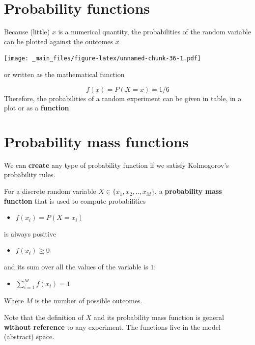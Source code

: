 \documentclass[
]{book}
\providecommand{\tightlist}{%
  \setlength{\itemsep}{0pt}\setlength{\parskip}{0pt}}
\begin{document}
\hypertarget{probability-functions}{%
\section{Probability functions}\label{probability-functions}}

Because (little) \(x\) is a numerical quantity, the probabilities of the random variable can be plotted against the outcomes \(x\)

\texttt{[image: \_main\_files/figure-latex/unnamed-chunk-36-1.pdf]}

or written as the mathematical function

\[f(x)=P(X=x)=1/6\]
Therefore, the probabilities of a random experiment can be given in table, in a plot or as a \textbf{function}.

\hypertarget{probability-mass-functions}{%
\section{Probability mass functions}\label{probability-mass-functions}}

We can \textbf{create} any type of probability function if we satisfy Kolmogorov's probability rules.

For a discrete random variable \(X \in \{x_1 , x_2 , .. , x_M\}\), a \textbf{probability mass function} that is used to compute probabilities

\begin{itemize}
\tightlist
\item
  \(f(x_i)=P(X=x_i)\)
\end{itemize}

is always positive

\begin{itemize}
\tightlist
\item
  \(f(x_i)\geq 0\)
\end{itemize}

and its sum over all the values of the variable is \(1\):

\begin{itemize}
\tightlist
\item
  \(\sum_{i=1}^M f(x_i)=1\)
\end{itemize}

Where \(M\) is the number of possible outcomes.

Note that the definition of \(X\) and its probability mass function is general \textbf{without reference} to any experiment. The functions live in the model (abstract) space.
\end{document}
